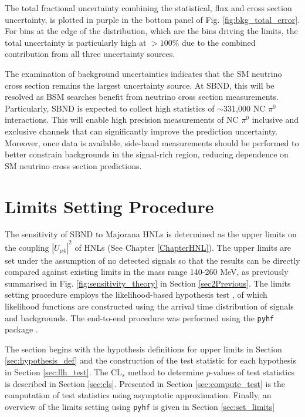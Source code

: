 The total fractional uncertainty combining the statistical, flux and cross section uncertainty, is plotted in purple in the bottom panel of Fig. \ref{fig:bkg_total_error}.
For bins at the edge of the distribution, which are the bins driving the limits, the total uncertainty is particularly high at $> 100\%$ due to the combined contribution from all three uncertainty sources.

The examination of background uncertainties indicates that the SM neutrino cross section remains the largest uncertainty source.
At SBND, this will be resolved as BSM searches benefit from neutrino cross section measurements.
Particularly, SBND is expected to collect high statistics of $\sim$331,000 NC $\pi^0$ interactions.
This will enable high precision measurements of NC $\pi^0$ inclusive and exclusive channels that can significantly improve the prediction uncertainty.
Moreover, once data is available, side-band measurements should be performed to better constrain backgrounds in the signal-rich region, reducing dependence on SM neutrino cross section predictions.


\section{Limits Setting Procedure}
\label{sec:limit_procedure}

The sensitivity of SBND to Majorana HNLs is determined as the upper limits on the coupling $|U_{\mu4}|^2$ of HNLs (See Chapter \ref{ChapterHNL}).
The upper limits are set under the assumption of no detected signals so that the results can be directly compared against existing limits in the mass range 140-260 MeV, as previously summarised in Fig. \ref{fig:sensitivity_theory} in Section \ref{sec2Previous}. 
The limits setting procedure employs the likelihood-based hypothesis test \cite{asymptotic_test}, of which likelihood functions are constructed using the arrival time distribution of signals and backgrounds.
The end-to-end procedure was performed using the \texttt{pyhf} package \cite{pyhf_joss}.

The section begins with the hypothesis definitions for upper limits in Section \ref{sec:hypothesis_def} and the construction of the test statistic for each hypothesis in Section \ref{sec:llh_test}.
The CL$_{s}$ method to determine \textit{p}-values of test statistics is described in Section \ref{sec:cls}.
Presented in Section \ref{sec:compute_test} is the computation of test statistics using asymptotic approximation.
Finally, an overview of the limits setting using \texttt{pyhf} is given in Section \ref{sec:set_limits} 

